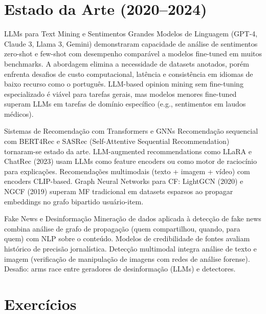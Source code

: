 \documentclass[12pt,a4paper]{article}
\begin{document}
\section{Estado da Arte (2020--2024)}

\begin{estadoartebox}{LLMs para Text Mining e Sentimentos}
Grandes Modelos de Linguagem (GPT-4, Claude 3, Llama 3, Gemini) demonstraram capacidade de análise de sentimentos zero-shot e few-shot com desempenho comparável a modelos fine-tuned em muitos benchmarks. A abordagem elimina a necessidade de datasets anotados, porém enfrenta desafios de custo computacional, latência e consistência em idiomas de baixo recurso como o português. LLM-based opinion mining sem fine-tuning especializado é viável para tarefas gerais, mas modelos menores fine-tuned superam LLMs em tarefas de domínio específico (e.g., sentimentos em laudos médicos).
\end{estadoartebox}

\begin{estadoartebox}{Sistemas de Recomendação com Transformers e GNNs}
Recomendação sequencial com BERT4Rec e SASRec (Self-Attentive Sequential Recommendation) tornaram-se estado da arte. LLM-augmented recommendations como LLaRA e ChatRec (2023) usam LLMs como feature encoders ou como motor de raciocínio para explicações. Recomendações multimodais (texto + imagem + vídeo) com encoders CLIP-based. Graph Neural Networks para CF: LightGCN (2020) e NGCF (2019) superam MF tradicional em datasets esparsos ao propagar embeddings no grafo bipartido usuário-item.
\end{estadoartebox}

\begin{estadoartebox}{Fake News e Desinformação}
Mineração de dados aplicada à detecção de fake news combina análise de grafo de propagação (quem compartilhou, quando, para quem) com NLP sobre o conteúdo. Modelos de credibilidade de fontes avaliam histórico de precisão jornalística. Detecção multimodal integra análise de texto e imagem (verificação de manipulação de imagens com redes de análise forense). Desafio: arms race entre geradores de desinformação (LLMs) e detectores.
\end{estadoartebox}

\section{Exercícios}
\end{document}
